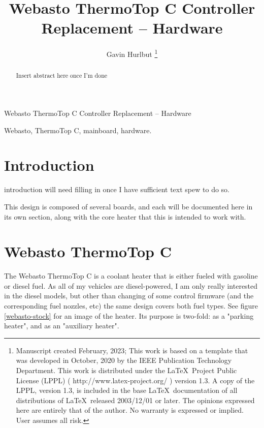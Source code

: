 \documentclass[lettersize,journal]{IEEEtran}
\begin{document}
\title{Webasto ThermoTop C Controller Replacement -- Hardware}
\author{Gavin Hurlbut
\thanks{Manuscript created February, 2023; This work is based on a template that was developed in October, 2020 by the IEEE Publication Technology Department.  This work is distributed under the \LaTeX \ Project Public License (LPPL) ( http://www.latex-project.org/ ) version 1.3. A copy of the LPPL, version 1.3, is included in the base \LaTeX \ documentation of all distributions of \LaTeX \ released 2003/12/01 or later. The opinions expressed here are entirely that of the author. No warranty is expressed or implied. User assumes all risk.}}

%
{Webasto ThermoTop C Controller Replacement -- Hardware}

\maketitle

\begin{abstract}
Insert abstract here once I'm done
\end{abstract}

\begin{IEEEkeywords}
Webasto, ThermoTop C, mainboard, hardware.
\end{IEEEkeywords}


\section{Introduction}
 introduction will need filling in once I have sufficient text spew to do so.

This design is composed of several boards, and each will be documented here in its own section, along with the core heater that this is intended to work with.

\section{Webasto ThermoTop C}

\noindent The Webasto ThermoTop C is a coolant heater that is either fueled with gasoline or diesel fuel.  As all of my vehicles are diesel-powered, I am only really interested in the diesel models, but other than changing of some control firmware (and the corresponding fuel nozzles, etc) the same design covers both fuel types.  See figure \ref{webasto-stock} for an image of the heater.  Its purpose is two-fold: as a "parking heater", and as an "auxiliary heater".  
\end{document}
